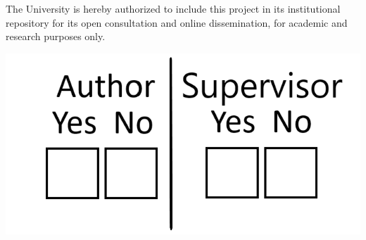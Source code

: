 \begin{titlepage}
{    \vspace{22mm}
    \hspace{0.5cm}
    \parbox[b]{3.8in}{
        \selectfont \small
        The University is hereby authorized to include this project in its institutional repository for its open consultation and online dissemination, for academic and research purposes only.
        }
    \hspace{1.9cm}
    \includegraphics[scale=0.2]{Images/tik_cross_blank.png}
    }
\end{titlepage}

{
\newpage
\thispagestyle{empty}
\mbox{}
\newpage
}